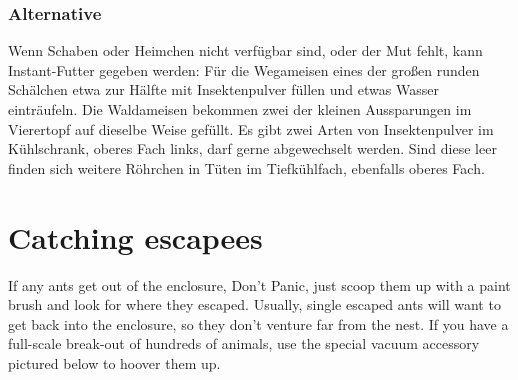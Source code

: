 \subsubsection{Alternative}
Wenn Schaben oder Heimchen nicht verfügbar sind, oder der Mut fehlt, kann Instant-Futter gegeben werden:
Für die Wegameisen eines der großen runden Schälchen etwa zur Hälfte mit Insektenpulver füllen und etwas Wasser einträufeln.
Die Waldameisen bekommen zwei der kleinen Aussparungen im Vierertopf auf dieselbe Weise gefüllt.
Es gibt zwei Arten von Insektenpulver im Kühlschrank, oberes Fach links, darf gerne abgewechselt werden. Sind diese leer finden sich weitere Röhrchen in Tüten im Tiefkühlfach, ebenfalls oberes Fach.

\section{Catching escapees}
If any ants get out of the enclosure, Don't Panic, just scoop them up with a paint brush and look for where they escaped.
Usually, single escaped ants will want to get back into the enclosure, so they don't venture far from the nest.
If you have a full-scale break-out of hundreds of animals, use the special vacuum accessory pictured below to hoover them up.
